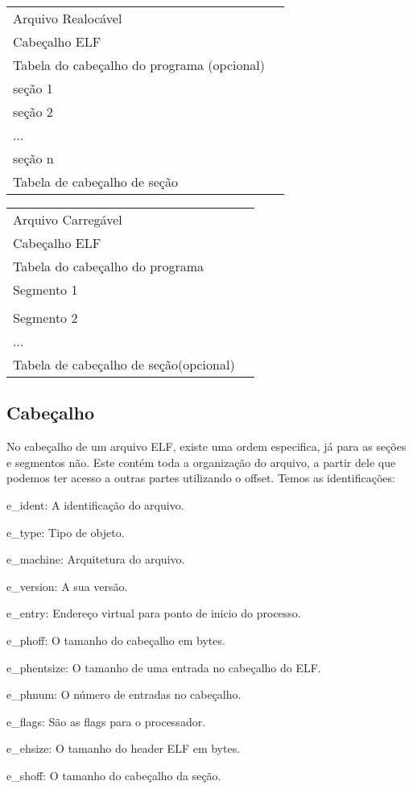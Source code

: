 \begin{list}{}
\item {\begin{tabular}{|l|c|}
\hline
 Arquivo Realocável & \tabularnewline
\cline{1-1}  
Cabeçalho ELF & \tabularnewline
\cline{1-1}
Tabela do cabeçalho do programa (opcional) & \tabularnewline
\cline{1-1} 
seção 1 & \tabularnewline
\cline{1-1} 
seção 2 & \tabularnewline
\cline{1-1} 
... & \tabularnewline
\cline{1-1}
seção n & \tabularnewline
\cline{1-1} 
Tabela de cabeçalho de seção & \tabularnewline
\cline{1-1}
\end{tabular}
\begin{tabular}{|l|c|}
\hline
Arquivo Carregável &\tabularnewline
\cline{1-1}
Cabeçalho ELF & \tabularnewline
\cline{1-1}
Tabela do cabeçalho do programa & \tabularnewline
\cline{1-1} 
Segmento 1 & \tabularnewline
\cline{1-1} 
 & \tabularnewline
\cline{1-1}
Segmento 2 & \tabularnewline
\cline{1-1}
... & \tabularnewline
\cline{1-1}
Tabela de cabeçalho de seção(opcional) & \tabularnewline
\cline{1-1}
\end{tabular}}
\end{list}


\subsection{Cabeçalho}
   No cabeçalho de um arquivo ELF, existe uma ordem especifica, já para as seções e segmentos não.
   Este contém toda a organização do arquivo, a partir dele que podemos ter acesso a outras partes utilizando o offset.
   Temos as identificações:

   e\_ident: A identificação do arquivo.

   e\_type: Tipo de objeto.

   e\_machine: Arquitetura do arquivo.
   
   e\_version: A sua versão.
  
   e\_entry: Endereço virtual para ponto de inicio do processo.
   
   e\_phoff: O tamanho do cabeçalho em bytes.
   
   e\_phentsize: O tamanho de uma entrada no cabeçalho do ELF.
   
   e\_phnum: O número de entradas no cabeçalho.
   
   e\_flags: São as flags para o processador.
   
   e\_ehsize: O tamanho do header ELF em bytes.
   
   e\_shoff: O tamanho do cabeçalho da seção.
   
